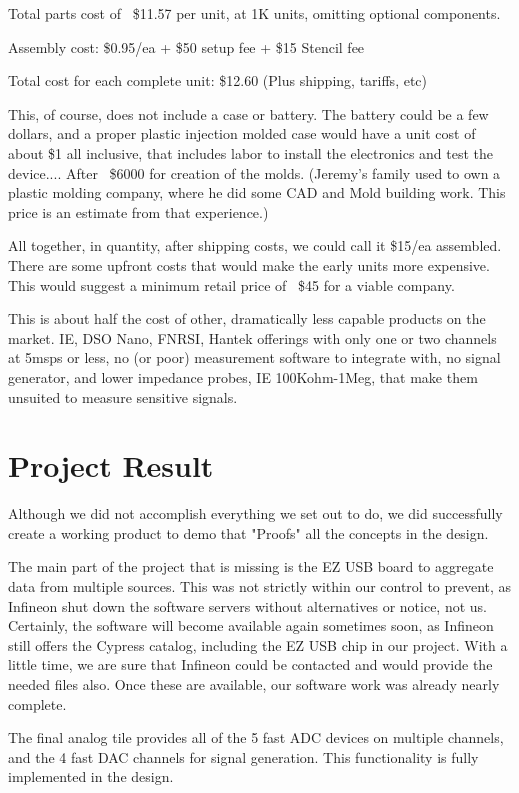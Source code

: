 Total parts cost of ~\$11.57 per unit, at 1K units, omitting optional components.

Assembly cost: \$0.95/ea + \$50 setup fee + \$15 Stencil fee

Total cost for each complete unit: \$12.60
(Plus shipping, tariffs, etc)

This, of course, does not include a case or battery. The battery could be a few dollars, and a proper plastic injection molded case would have a unit cost of about \$1 all inclusive, that includes labor to install the electronics and test the device.... After ~\$6000 for creation of the molds. (Jeremy's family used to own a plastic molding company, where he did some CAD and Mold building work. This price is an estimate from that experience.)

All together, in quantity, after shipping costs, we could call it \$15/ea assembled. There are some upfront costs that would make the early units more expensive. This would suggest a minimum retail price of ~\$45 for a viable company.

This is about half the cost of other, dramatically less capable products on the market. IE, DSO Nano, FNRSI, Hantek offerings with only one or two channels at 5msps or less, no (or poor) measurement software to integrate with, no signal generator, and lower impedance probes, IE 100Kohm-1Meg, that make them unsuited to measure sensitive signals.

\section{Project Result}
Although we did not accomplish everything we set out to do, we did successfully create a working product to demo that "Proofs" all the concepts in the design.

The main part of the project that is missing is the EZ USB board to aggregate data from multiple sources. This was not strictly within our control to prevent, as Infineon shut down the software servers without alternatives or notice, not us. Certainly, the software will become available again sometimes soon, as Infineon still offers the Cypress catalog, including the EZ USB chip in our project. With a little time, we are sure that Infineon could be contacted and would provide the needed files also. Once these are available, our software work was already nearly complete.

The final analog tile provides all of the 5 fast ADC devices on multiple channels, and the 4 fast DAC channels for signal generation. This functionality is fully implemented in the design.

